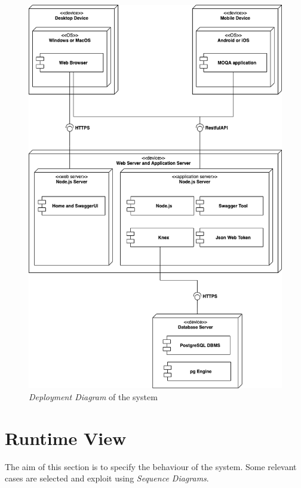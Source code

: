 \begin{figure}[H]
\begin{center}
  \includegraphics[width=\textwidth,height=.83\textheight,keepaspectratio]{img/archi/deployment.png}
  \hspace{0.05\linewidth}
  \centering
  \caption{\textit{Deployment Diagram} of the system}
  \label{img:archi_deployment}
\end{center}
\end{figure}

\section{Runtime View}\label{sec:runtime}
The aim of this section is to specify the behaviour of the system. Some relevant cases are selected and exploit using \textit{Sequence Diagrams}.

